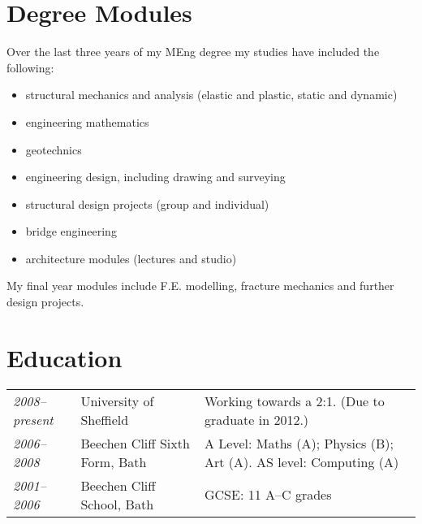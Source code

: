 \documentclass[oneside,a4paper]{article}
\begin{document}
\section*{Degree Modules}

Over the last three years of my MEng degree my studies have included the following:

\begin{itemize}
\item structural mechanics and analysis (elastic and plastic, static and dynamic)
\item engineering mathematics
\item geotechnics
\item engineering design, including drawing and surveying
\item structural design projects (group and individual)
\item bridge engineering
\item architecture modules (lectures and studio)
\end{itemize}

My final year modules include F.E. modelling, fracture mechanics and further design projects.

\section*{Education}

\hspace{-6pt}\begin{tabular}{>{\it}lll}
2008--present & University of Sheffield & Working towards a 2:1. (Due to graduate in 2012.) \\
2006--2008 & Beechen Cliff Sixth Form, Bath & A Level: Maths (A); Physics (B); Art (A). AS level: Computing (A) \\
2001--2006 & Beechen Cliff School, Bath & GCSE: 11 A--C grades
\end{tabular}
\end{document}
